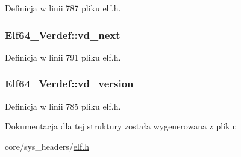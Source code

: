 Definicja w linii 787 pliku elf.\-h.

\hypertarget{struct_elf64___verdef_a9cebd5131a542990d3130489a3b4acec}{
\subsubsection[{vd\-\_\-next}]{ Elf64\-\_\-\-Verdef\-::vd\-\_\-next}}\label{struct_elf64___verdef_a9cebd5131a542990d3130489a3b4acec}


Definicja w linii 791 pliku elf.\-h.

\hypertarget{struct_elf64___verdef_afe15c8d72df394443deb40da61df3459}{
\subsubsection[{vd\-\_\-version}]{ Elf64\-\_\-\-Verdef\-::vd\-\_\-version}}\label{struct_elf64___verdef_afe15c8d72df394443deb40da61df3459}


Definicja w linii 785 pliku elf.\-h.



Dokumentacja dla tej struktury została wygenerowana z pliku\-:\begin{DoxyCompactItemize}
\item 
core/sys\-\_\-headers/\hyperlink{elf_8h}{elf.\-h}\end{DoxyCompactItemize}
